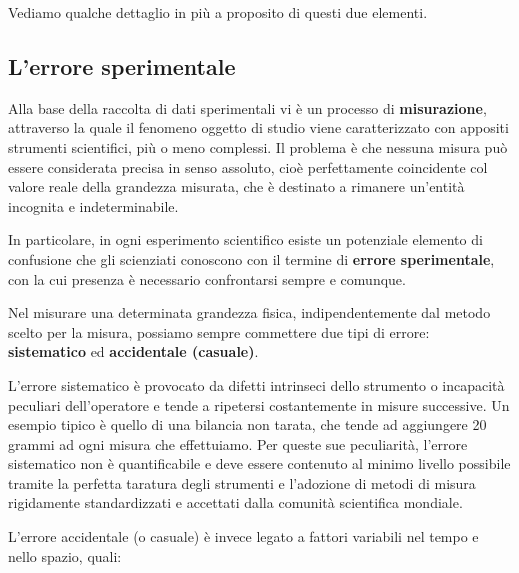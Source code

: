 \documentclass[a4paper,12pt,oneside]{book}
\begin{document}
Vediamo qualche dettaglio in più a proposito di questi due elementi.

\subsection{L'errore sperimentale}\label{lerrore-sperimentale}

Alla base della raccolta di dati sperimentali vi è un processo di
\textbf{misurazione}, attraverso la quale il fenomeno oggetto di studio
viene caratterizzato con appositi strumenti scientifici, più o meno
complessi. Il problema è che nessuna misura può essere considerata
precisa in senso assoluto, cioè perfettamente coincidente col valore
reale della grandezza misurata, che è destinato a rimanere un'entità
incognita e indeterminabile.

In particolare, in ogni esperimento scientifico esiste un potenziale
elemento di confusione che gli scienziati conoscono con il termine di
\textbf{errore sperimentale}, con la cui presenza è necessario
confrontarsi sempre e comunque.

Nel misurare una determinata grandezza fisica, indipendentemente dal
metodo scelto per la misura, possiamo sempre commettere due tipi di
errore: \textbf{sistematico} ed \textbf{accidentale (casuale)}.

L'errore sistematico è provocato da difetti intrinseci dello strumento o
incapacità peculiari dell'operatore e tende a ripetersi costantemente in
misure successive. Un esempio tipico è quello di una bilancia non
tarata, che tende ad aggiungere 20 grammi ad ogni misura che
effettuiamo. Per queste sue peculiarità, l'errore sistematico non è
quantificabile e deve essere contenuto al minimo livello possibile
tramite la perfetta taratura degli strumenti e l'adozione di metodi di
misura rigidamente standardizzati e accettati dalla comunità scientifica
mondiale.

L'errore accidentale (o casuale) è invece legato a fattori variabili nel
tempo e nello spazio, quali:
\end{document}

